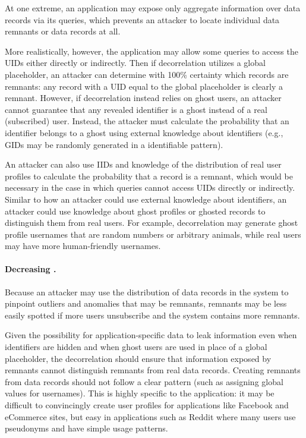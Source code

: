At one extreme, an application may expose only aggregate information over data records via its
queries, which prevents an attacker to locate individual data remnants or data records at all. 

More realistically, however, the application may allow some queries to access the UIDs either
directly or indirectly. Then if decorrelation utilizes a global placeholder, an attacker can
determine with 100\% certainty which records are remnants: any record with a UID equal to the global
placeholder is clearly a remnant. However, if decorrelation instead relies on ghost users, an
attacker cannot guarantee that any revealed identifier is a ghost instead of a real (subscribed)
user. Instead, the attacker must calculate the probability that an identifier belongs to a ghost
using external knowledge about identifiers (e.g., GIDs may be randomly generated in a identifiable
pattern). 

An attacker can also use IIDs and knowledge of the distribution of real user profiles to calculate the
probability that a record is a remnant, which would be necessary in the case in which queries cannot
access UIDs directly or indirectly. Similar to how an attacker could use external knowledge about
identifiers, an attacker could use knowledge about ghost profiles or ghosted records to distinguish
them from real users.  For example, decorrelation may generate ghost profile usernames that are
random numbers or arbitrary animals, while real users may have more human-friendly usernames.

\paragraph{Decreasing \premnant{}.}
Because an attacker may use the distribution of data records in the system to pinpoint outliers and
anomalies that may be remnants, remnants may be less easily spotted if more users unsubscribe and
the system contains more remnants. 

Given the possibility for application-specific data to leak information even when identifiers are
hidden and when ghost users are used in place of a global placeholder, the decorrelation should
ensure that information exposed by remnants cannot distinguish remnants from real data records.
Creating remnants from data records should not follow a clear pattern (such as assigning global
values for usernames).  This is highly specific to the application: it may be difficult to
convincingly create user profiles for applications like Facebook and eCommerce sites, but easy in
applications such as Reddit where many users use pseudonyms and have simple usage patterns.

